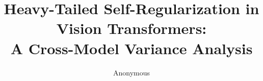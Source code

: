 \documentclass[10pt]{article}
\title{Heavy-Tailed Self-Regularization in Vision Transformers:\\A Cross-Model Variance Analysis}
\author{Anonymous}
\date{}
\begin{document}
\maketitle

\begin{abstract}

\end{abstract}











\end{document}
